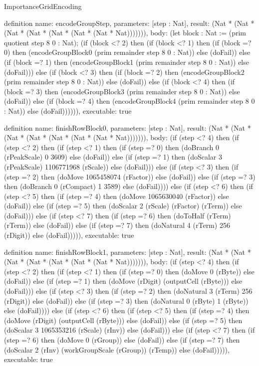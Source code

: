 \begin{lexlean}{ImportanceGridEncoding}
\begin{semanticmodule}
definition{
  name: encodeGroupStep,
  parameters: [step : Nat],
  result: (Nat * (Nat * (Nat * (Nat * (Nat * (Nat * (Nat * Nat))))))),
  body: (let block : Nat := (prim quotient step 8 0 : Nat); (if (block <? 2) then
      (if (block <? 1) then
      (if (block =? 0) then (encodeGroupBlock0 (prim remainder step 8 0 : Nat)) else (doFail)) else
      (if (block =? 1) then (encodeGroupBlock1 (prim remainder step 8 0 : Nat)) else (doFail))) else
      (if (block <? 3) then
      (if (block =? 2) then (encodeGroupBlock2 (prim remainder step 8 0 : Nat)) else (doFail)) else
      (if (block <? 4) then
      (if (block =? 3) then (encodeGroupBlock3 (prim remainder step 8 0 : Nat)) else (doFail)) else
      (if (block =? 4) then (encodeGroupBlock4 (prim remainder step 8 0 : Nat)) else (doFail)))))),
  executable: true
}

definition{
  name: finishRowBlock0,
  parameters: [step : Nat],
  result: (Nat * (Nat * (Nat * (Nat * (Nat * (Nat * (Nat * Nat))))))),
  body: (if (step <? 4) then
      (if (step <? 2) then
      (if (step <? 1) then
      (if (step =? 0) then (doBranch 0 (rPeakScale) 0 3609) else (doFail)) else
      (if (step =? 1) then (doScalar 3 (rPeakScale) 1106771968 (rScale)) else (doFail))) else
      (if (step <? 3) then
      (if (step =? 2) then (doMove 1065458074 (rFactor)) else (doFail)) else
      (if (step =? 3) then (doBranch 0 (rCompact) 1 3589) else (doFail)))) else
      (if (step <? 6) then
      (if (step <? 5) then
      (if (step =? 4) then (doMove 1065630040 (rFactor)) else (doFail)) else
      (if (step =? 5) then (doScalar 2 (rScale) (rFactor) (rTerm)) else (doFail))) else
      (if (step <? 7) then
      (if (step =? 6) then (doToHalf (rTerm) (rTerm)) else (doFail)) else
      (if (step =? 7) then (doNatural 4 (rTerm) 256 (rDigit)) else (doFail))))),
  executable: true
}

definition{
  name: finishRowBlock1,
  parameters: [step : Nat],
  result: (Nat * (Nat * (Nat * (Nat * (Nat * (Nat * (Nat * Nat))))))),
  body: (if (step <? 4) then
      (if (step <? 2) then
      (if (step <? 1) then
      (if (step =? 0) then (doMove 0 (rByte)) else (doFail)) else
      (if (step =? 1) then (doMove (rDigit) (outputCell (rByte))) else (doFail))) else
      (if (step <? 3) then
      (if (step =? 2) then (doNatural 3 (rTerm) 256 (rDigit)) else (doFail)) else
      (if (step =? 3) then (doNatural 0 (rByte) 1 (rByte)) else (doFail)))) else
      (if (step <? 6) then
      (if (step <? 5) then
      (if (step =? 4) then (doMove (rDigit) (outputCell (rByte))) else (doFail)) else
      (if (step =? 5) then (doScalar 3 1065353216 (rScale) (rInv)) else (doFail))) else
      (if (step <? 7) then
      (if (step =? 6) then (doMove 0 (rGroup)) else (doFail)) else
      (if (step =? 7) then (doScalar 2 (rInv) (workGroupScale (rGroup)) (rTemp)) else (doFail))))),
  executable: true
}


\end{semanticmodule}
\end{lexlean}
